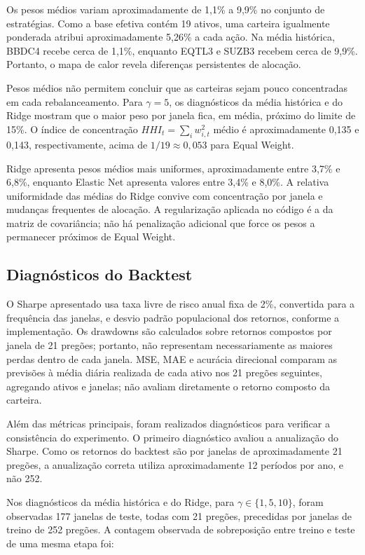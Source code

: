 \documentclass[12pt,a4paper]{article}
\begin{document}
Os pesos médios variam aproximadamente de 1,1\% a 9,9\% no conjunto de estratégias. Como a base efetiva contém 19 ativos, uma carteira igualmente ponderada atribui aproximadamente 5,26\% a cada ação. Na média histórica, BBDC4 recebe cerca de 1,1\%, enquanto EQTL3 e SUZB3 recebem cerca de 9,9\%. Portanto, o mapa de calor revela diferenças persistentes de alocação.

Pesos médios não permitem concluir que as carteiras sejam pouco concentradas em cada rebalanceamento. Para $\gamma=5$, os diagnósticos da média histórica e do Ridge mostram que o maior peso por janela fica, em média, próximo do limite de 15\%. O índice de concentração $HHI_t=\sum_i w_{i,t}^2$ médio é aproximadamente 0,135 e 0,143, respectivamente, acima de $1/19\approx0,053$ para Equal Weight.

Ridge apresenta pesos médios mais uniformes, aproximadamente entre 3,7\% e 6,8\%, enquanto Elastic Net apresenta valores entre 3,4\% e 8,0\%. A relativa uniformidade das médias do Ridge convive com concentração por janela e mudanças frequentes de alocação. A regularização aplicada no código é a da matriz de covariância; não há penalização adicional que force os pesos a permanecer próximos de Equal Weight.

\subsection{Diagnósticos do Backtest}

O Sharpe apresentado usa taxa livre de risco anual fixa de 2\%, convertida para a frequência das janelas, e desvio padrão populacional dos retornos, conforme a implementação. Os drawdowns são calculados sobre retornos compostos por janela de 21 pregões; portanto, não representam necessariamente as maiores perdas dentro de cada janela. MSE, MAE e acurácia direcional comparam as previsões à média diária realizada de cada ativo nos 21 pregões seguintes, agregando ativos e janelas; não avaliam diretamente o retorno composto da carteira.

Além das métricas principais, foram realizados diagnósticos para verificar a consistência do experimento. O primeiro diagnóstico avaliou a anualização do Sharpe. Como os retornos do backtest são por janelas de aproximadamente 21 pregões, a anualização correta utiliza aproximadamente 12 períodos por ano, e não 252.

Nos diagnósticos da média histórica e do Ridge, para $\gamma\in\{1,5,10\}$, foram observadas 177 janelas de teste, todas com 21 pregões, precedidas por janelas de treino de 252 pregões. A contagem observada de sobreposição entre treino e teste de uma mesma etapa foi:
\end{document}
